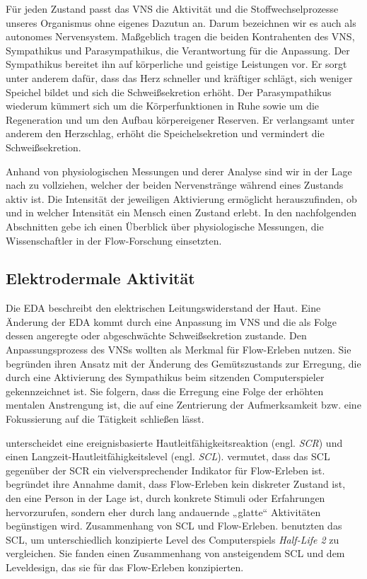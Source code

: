 Für jeden Zustand passt das \ac{VNS} die Aktivität und die Stoffwechselprozesse unseres Organismus ohne eigenes Dazutun an. Darum bezeichnen wir es auch als autonomes Nervensystem. Maßgeblich tragen die beiden Kontrahenten des \ac{VNS}, Sympathikus und Parasympathikus, die Verantwortung für die Anpassung. Der Sympathikus bereitet ihn auf körperliche und geistige Leistungen vor. Er sorgt unter anderem dafür, dass das Herz schneller und kräftiger schlägt, sich weniger Speichel bildet und sich die Schweißsekretion erhöht. Der Parasympathikus wiederum kümmert sich um die Körperfunktionen in Ruhe sowie um die Regeneration und um den Aufbau körpereigener Reserven. Er verlangsamt unter anderem den Herzschlag, erhöht die Speichelsekretion und vermindert die Schweißsekretion.

Anhand von physiologischen Messungen und derer Analyse sind wir in der Lage nach zu vollziehen, welcher der beiden Nervenstränge während eines Zustands aktiv ist. Die Intensität der jeweiligen Aktivierung ermöglicht herauszufinden, ob und in welcher Intensität ein Mensch einen Zustand erlebt. In den nachfolgenden Abschnitten gebe ich einen Überblick über physiologische Messungen, die Wissenschaftler in der Flow-Forschung einsetzten.

\subsection{Elektrodermale Aktivität}

Die \ac{EDA} beschreibt den elektrischen Leitungswiderstand der Haut. Eine Änderung der \ac{EDA} kommt durch eine Anpassung im \ac{VNS} und die als Folge dessen angeregte oder abgeschwächte Schweißsekretion zustande. Den Anpassungsprozess des \ac{VNS}s wollten \citet{Kivikangas2006, Nacke2008} als Merkmal für Flow-Erleben nutzen. Sie begründen ihren Ansatz mit der Änderung des Gemütszustands zur Erregung, die durch eine Aktivierung des Sympathikus beim sitzenden Computerspieler gekennzeichnet ist. Sie folgern, dass die Erregung eine Folge der erhöhten mentalen Anstrengung ist, die auf eine Zentrierung der Aufmerksamkeit bzw. eine Fokussierung auf die Tätigkeit schließen lässt.

\citet{Kilpatrick1972} unterscheidet eine ereignisbasierte Hautleitfähigkeitsreaktion (engl. \emph{\ac{SCR}}) und einen Langzeit-Hautleitfähigkeitslevel (engl. \emph{\ac{SCL}}). \citet[][S.~158]{Peifer2012} vermutet, dass das \ac{SCL} gegenüber der \ac{SCR} ein vielversprechender Indikator für Flow-Erleben ist. \citet[][S.~158]{Peifer2012} begründet ihre Annahme damit, dass Flow-Erleben kein diskreter Zustand ist, den eine Person in der Lage ist, durch konkrete Stimuli oder Erfahrungen hervorzurufen, sondern eher durch lang andauernde „glatte“ Aktivitäten begünstigen wird. Zusammenhang von \ac{SCL} und Flow-Erleben. \citet{Nacke2008} benutzten das \ac{SCL}, um unterschiedlich konzipierte Level des Computerspiels \emph{Half-Life 2} zu vergleichen. Sie fanden einen Zusammenhang von ansteigendem \ac{SCL} und dem Leveldesign, das sie für das Flow-Erleben konzipierten.

